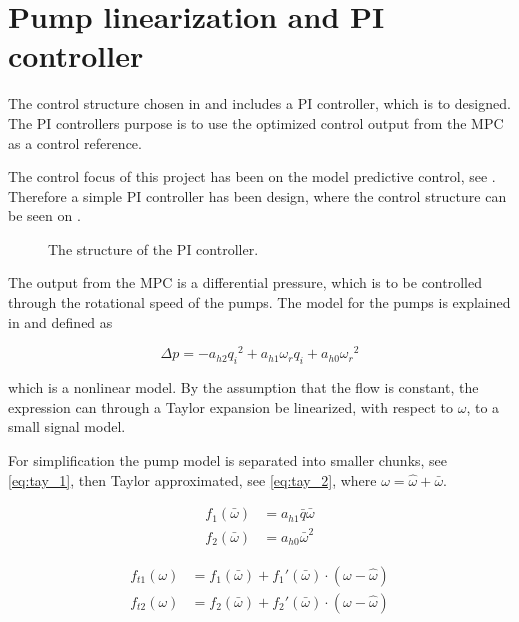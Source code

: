 \chapter{Pump linearization and PI controller}
\label{cha:linear_pump}

The control structure chosen in  and  includes a PI controller, which is to designed. The PI controllers purpose is to use the optimized control output from the MPC as a control reference. 

The control focus of this project has been on the model predictive control, see . Therefore a simple PI controller has been design, where the control structure can be seen on .

\begin{figure}[H]
\centering
  
\caption{The structure of the PI controller.}
\label{fig:simple_PI}
\end{figure}

The output from the MPC is a differential pressure, which is to be controlled through the rotational speed of the pumps. The model for the pumps is explained in  and defined as

\begin{equation*}
\Delta p = -a_{h2}{q_i}^2 + a_{h1} \omega_r q_i + a_{h0}{\omega_r}^2
\end{equation*}

which is a nonlinear model. By the assumption that the flow is constant, the expression can through a Taylor expansion be linearized, with respect to $\omega$, to a small signal model.


For simplification the pump model is separated into smaller chunks, see \eqref{eq:tay_1}, then Taylor approximated, see \eqref{eq:tay_2}, where $\omega = \hat{\omega}+\bar{\omega}$.

\begin{equation}
\begin{split}
f_1(\bar{\omega}) &= a_{h1}\bar{q}\bar{\omega} \\
f_2(\bar{\omega}) &= a_{h0}\bar{\omega}^2
\end{split}
\label{eq:tay_1}
\end{equation}


\begin{equation}
\begin{split}
f_{t1}(\omega) &= f_1(\bar{\omega}) + f_1'(\bar{\omega})\cdot(\omega - \hat{\omega}) \\
f_{t2}(\omega) &= f_2(\bar{\omega}) + f_2'(\bar{\omega})\cdot(\omega - \hat{\omega})
\end{split}
\label{eq:tay_2}
\end{equation}


